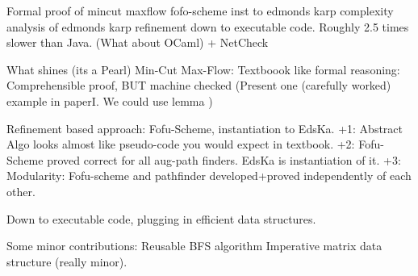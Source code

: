 \documentclass{llncs}
\begin{document}
  Formal proof of mincut maxflow
  fofo-scheme
  inst to edmonds karp
  complexity analysis of edmonds karp
  refinement down to executable code. Roughly 2.5 times slower than Java. (What about OCaml)
    + NetCheck
    
What shines (its a Pearl)
  Min-Cut Max-Flow: Textboook like formal reasoning: Comprehensible proof, BUT machine checked
    (Present one (carefully worked) example in paperI. We could use lemma )
    
  Refinement based approach: Fofu-Scheme, instantiation to EdsKa. 
    +1: Abstract Algo looks almost like pseudo-code you would expect in textbook.
    +2: Fofu-Scheme proved correct for all aug-path finders. EdsKa is instantiation of it.
    +3: Modularity: Fofu-scheme and pathfinder developed+proved independently of each other.
  
  Down to executable code, plugging in efficient data structures.
  
Some minor contributions:
  Reusable BFS algorithm
  Imperative matrix data structure (really minor).
  
  
  
    









\end{document}
